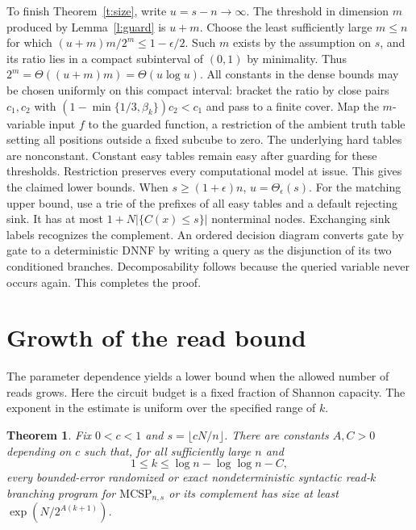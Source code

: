 \documentclass[11pt]{article}
\newtheorem{theorem}{Theorem}[section]
\newcommand{\mc}{\mathrm{MCSP}}
\begin{document}
To finish Theorem~\ref{t:size}, write $u=s-n\to\infty$. The threshold in dimension $m$ produced by Lemma~\ref{l:guard} is $u+m$. Choose the least sufficiently large $m\le n$ for which $(u+m)m/2^m\le1-\epsilon/2$. Such $m$ exists by the assumption on $s$, and its ratio lies in a compact subinterval of $(0,1)$ by minimality. Thus $2^m=\Theta((u+m)m)=\Theta(u\log u)$. All constants in the dense bounds may be chosen uniformly on this compact interval: bracket the ratio by close pairs $c_1,c_2$ with $(1-\min\{1/3,\beta_k\})c_2<c_1$ and pass to a finite cover. Map the $m$-variable input $f$ to the guarded function, a restriction of the ambient truth table setting all positions outside a fixed subcube to zero. The underlying hard tables are nonconstant. Constant easy tables remain easy after guarding for these thresholds. Restriction preserves every computational model at issue. This gives the claimed lower bounds. When $s\ge(1+\epsilon)n$, $u=\Theta_\epsilon(s)$. For the matching upper bound, use a trie of the prefixes of all easy tables and a default rejecting sink. It has at most $1+N|\{C(x)\le s\}|$ nonterminal nodes. Exchanging sink labels recognizes the complement. An ordered decision diagram converts gate by gate to a deterministic DNNF by writing a query as the disjunction of its two conditioned branches. Decomposability follows because the queried variable never occurs again. This completes the proof.

\section{Growth of the read bound}

The parameter dependence yields a lower bound when the allowed number of reads grows. Here the circuit budget is a fixed fraction of Shannon capacity. The exponent in the estimate is uniform over the specified range of $k$.

\begin{theorem}\label{t:quant}
Fix $0<c<1$ and $s=\lfloor cN/n\rfloor$. There are constants $A,C>0$ depending on $c$ such that, for all sufficiently large $n$ and
\[
  1\le k\le \log n-\log\log n-C,
\]
every bounded-error randomized or exact nondeterministic syntactic read-$k$ branching program for $\mc_{n,s}$ or its complement has size at least $\exp(N/2^{A(k+1)})$.
\end{theorem}
\end{document}
